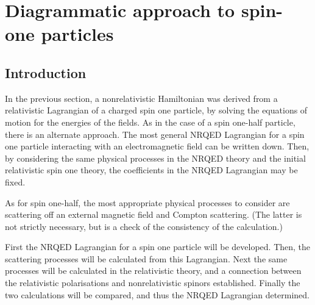 %  


% 
% 
% 
% 
% 
\chapter{Diagrammatic approach to spin-one particles}

\section{Introduction}
In the previous section, a nonrelativistic Hamiltonian was derived from a relativistic Lagrangian of a charged spin one particle, by solving the equations of motion for the energies of the fields.  As in the case of a spin one-half particle, there is an alternate approach.  The most general NRQED Lagrangian for a spin one particle interacting with an electromagnetic field can be written down.  Then, by considering the same physical processes in the NRQED theory and the initial relativistic spin one theory, the coefficients in the NRQED Lagrangian may be fixed.

As for spin one-half, the most appropriate physical processes to consider are scattering off an external magnetic field and Compton scattering.  (The latter is not strictly necessary, but is a check of the consistency of the calculation.)

First the NRQED Lagrangian for a spin one particle will be developed.  Then, the scattering processes will be calculated from this Lagrangian.  Next the same processes will be calculated in the relativistic theory, and a connection between the relativistic polarisations and nonrelativistic spinors established.  Finally the two calculations will be compared, and thus the NRQED Lagrangian determined.  

